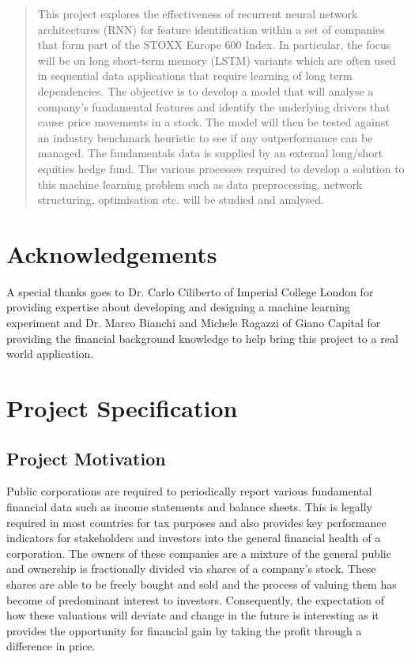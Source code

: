 \documentclass[10pt,onecolumn,letterpaper]{article}
\begin{document}

\begin{abstract}

This project explores the effectiveness of recurrent neural network architectures (RNN) for feature identification within a set of companies that form part of the STOXX Europe 600 Index. In particular, the focus will be on long short-term memory (LSTM) variants which are often used in sequential data applications that require learning of long term dependencies. The objective is to develop a model that will analyse a company's fundamental features and identify the underlying drivers that cause price movements in a stock. The model will then be tested against an industry benchmark heuristic to see if any outperformance can be managed. The fundamentals data is supplied by an external long/short equities hedge fund. The various processes required to develop a solution to this machine learning problem such as data preprocessing, network structuring, optimisation etc. will be studied and analysed.  

\end{abstract}

\section*{Acknowledgements}
A special thanks goes to Dr. Carlo Ciliberto of Imperial College London for providing expertise about developing and designing a machine learning experiment and Dr. Marco Bianchi and Michele Ragazzi of Giano Capital for providing the financial background knowledge to help bring this project to a real world application. 

\tableofcontents

\newpage

\section{Project Specification} %

\subsection{Project Motivation} \label{Project Motivation}

Public corporations are required to periodically report various fundamental financial data such as income statements and balance sheets. This is legally required in most countries for tax purposes and also provides key performance indicators for stakeholders and investors into the general financial health of a corporation. The owners of these companies are a mixture of the general public and ownership is fractionally divided via shares of a company's stock. These shares are able to be freely bought and sold and the process of valuing them has become of predominant interest to investors. Consequently, the expectation of how these valuations will deviate and change in the future is interesting as it provides the opportunity for financial gain by taking the profit through a difference in price. 
\end{document}
